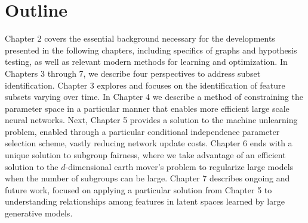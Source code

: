 \section{Outline}
Chapter 2 covers the essential background necessary for the developments presented in the following chapters, including specifics of graphs and hypothesis testing, as well as relevant modern methods for learning and optimization.
In Chapters 3 through 7, we describe four perspectives to address subset identification.
Chapter 3 explores and focuses on the identification of feature subsets varying over time.
In Chapter 4 we describe a method of constraining the parameter space in a particular manner
that enables more efficient large scale neural networks.
Next, Chapter 5 provides a solution to the machine unlearning problem,
enabled through a particular conditional independence parameter selection scheme, vastly reducing network update costs.
Chapter 6 ends with a unique solution to subgroup fairness, 
where we take advantage of an efficient solution to
the $d$-dimensional earth mover's problem
to regularize large models when the number of subgroups can be large.
Chapter 7 describes ongoing and future work, focused on applying a particular solution from Chapter 5 to understanding relationships among features in latent spaces learned by large generative models.




